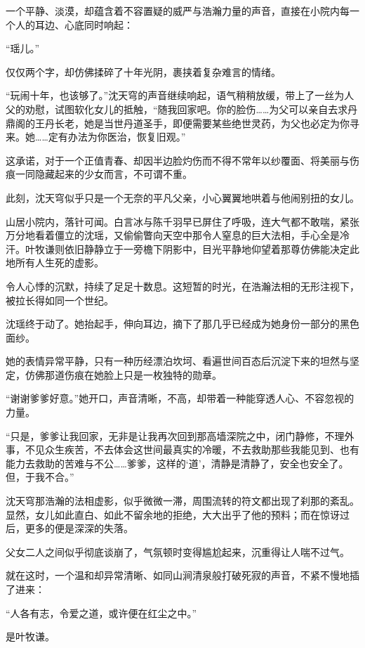 一个平静、淡漠，却蕴含着不容置疑的威严与浩瀚力量的声音，直接在小院内每一个人的耳边、心底同时响起：

“瑶儿。”

仅仅两个字，却仿佛揉碎了十年光阴，裹挟着复杂难言的情绪。

“玩闹十年，也该够了。”沈天穹的声音继续响起，语气稍稍放缓，带上了一丝为人父的劝慰，试图软化女儿的抵触，“随我回家吧。你的脸伤……为父可以亲自去求丹鼎阁的王丹长老，她是当世丹道圣手，即便需要某些绝世灵药，为父也必定为你寻来。她……定有办法为你医治，恢复旧观。”

这承诺，对于一个正值青春、却因半边脸灼伤而不得不常年以纱覆面、将美丽与伤痕一同隐藏起来的少女而言，不可谓不重。

此刻，沈天穹似乎只是一个无奈的平凡父亲，小心翼翼地哄着与他闹别扭的女儿。

山居小院内，落针可闻。白言冰与陈千羽早已屏住了呼吸，连大气都不敢喘，紧张万分地看着僵立的沈瑶，又偷偷瞥向天空中那令人窒息的巨大法相，手心全是冷汗。叶牧谦则依旧静静立于一旁檐下阴影中，目光平静地仰望着那尊仿佛能决定此地所有人生死的虚影。

令人心悸的沉默，持续了足足十数息。这短暂的时光，在浩瀚法相的无形注视下，被拉长得如同一个世纪。

沈瑶终于动了。她抬起手，伸向耳边，摘下了那几乎已经成为她身份一部分的黑色面纱。

她的表情异常平静，只有一种历经漂泊坎坷、看遍世间百态后沉淀下来的坦然与坚定，仿佛那道伤痕在她脸上只是一枚独特的勋章。

“谢谢爹爹好意。”她开口，声音清晰，不高，却带着一种能穿透人心、不容忽视的力量。

“只是，爹爹让我回家，无非是让我再次回到那高墙深院之中，闭门静修，不理外事，不见众生疾苦，不去体会这世间最真实的冷暖，不去救助那些我能见到、也有能力去救助的苦难与不公……爹爹，这样的‘道’，清静是清静了，安全也安全了。但，于我不合。”

沈天穹那浩瀚的法相虚影，似乎微微一滞，周围流转的符文都出现了刹那的紊乱。显然，女儿如此直白、如此不留余地的拒绝，大大出乎了他的预料；而在惊讶过后，更多的便是深深的失落。

父女二人之间似乎彻底谈崩了，气氛顿时变得尴尬起来，沉重得让人喘不过气。

\vspace{2em}

就在这时，一个温和却异常清晰、如同山涧清泉般打破死寂的声音，不紧不慢地插了进来：

“人各有志，令爱之道，或许便在红尘之中。”

是叶牧谦。

